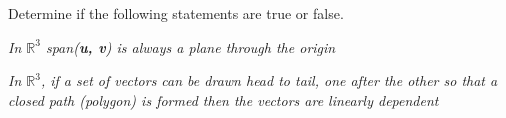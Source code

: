 \documentclass[12pt,letterpaper]{hmcpset}
\begin{document}
\newpage

\begin{center}
Determine if the following statements are true or false. 
\end{center}
\begin{problem}[Ch 2.1f]
\textit{In $\mathbb{R}^3$ span(\textbf{u, v}) is always a plane through the origin} 
\end{problem}

\begin{solution}

\end{solution}

\begin{problem}[Ch 2.1h]
\textit{In $\mathbb{R}^3$, if a set of vectors can be drawn head to tail, one after the other so that a closed path (polygon) is formed then the vectors are linearly dependent}
\end{problem}

\begin{solution}

\end{solution}
\end{document}
